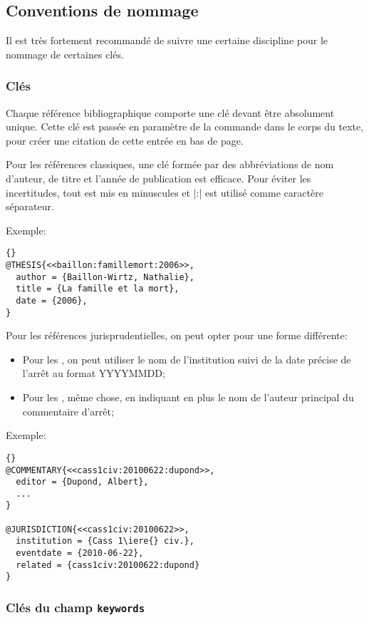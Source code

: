 \documentclass{ltxdockit}
\begin{document}
\subsection{Conventions de nommage}

Il est très fortement recommandé de suivre une certaine discipline pour le nommage de certaines clés.

\subsubsection{Clés \bibtex}

Chaque référence bibliographique comporte une clé \bibtex devant être absolument unique. Cette clé est passée en paramètre de la commande  dans le corps du texte, pour créer une citation de cette entrée en bas de page.

Pour les références classiques, une clé formée par des abbréviations de nom d'auteur, de titre et l'année de publication est efficace. Pour éviter les incertitudes, tout est mis en minuscules et |:| est utilisé comme caractère séparateur.

Exemple: 
\begin{lstlisting}[style=bibtex]{}
@THESIS{<<baillon:famillemort:2006>>,
  author = {Baillon-Wirtz, Nathalie},
  title = {La famille et la mort},
  date = {2006},
}
\end{lstlisting}

Pour les références jurisprudentielles, on peut opter pour une forme différente:
\begin{itemize}
\item Pour les , on peut utiliser le nom de l'institution suivi de la date précise de l'arrêt au format YYYYMMDD;
\item Pour les , même chose, en indiquant en plus le nom de l'auteur principal du commentaire d'arrêt;
\end{itemize}

Exemple:
\begin{lstlisting}[style=bibtex]{}
@COMMENTARY{<<cass1civ:20100622:dupond>>,
  editor = {Dupond, Albert},
  ...
}

@JURISDICTION{<<cass1civ:20100622>>,
  institution = {Cass 1\iere{} civ.},
  eventdate = {2010-06-22},
  related = {cass1civ:20100622:dupond}
}

\end{lstlisting}

\subsubsection{Clés du champ \texttt{keywords}}
\end{document}
